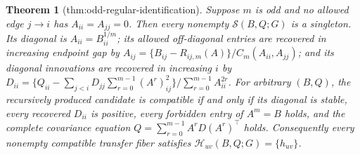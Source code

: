 \documentclass{article}
\newtheorem{theorem}{Theorem}
\begin{document}
\begin{theorem}[thm:odd-regular-identification]\label{thm:odd-regular-identification}
Suppose \(m\) is odd and no allowed edge \(j\to i\) has \(A_{ii}=A_{jj}=0\). Then every nonempty \(\mathcal S(B,Q;G)\) is a singleton. Its diagonal is \(A_{ii}=B_{ii}^{1/m}\); its allowed off-diagonal entries are recovered in increasing endpoint gap by \(A_{ij}=\{B_{ij}-R_{ij,m}(A)\}/C_m(A_{ii},A_{jj})\); and its diagonal innovations are recovered in increasing \(i\) by \(D_{ii}=\{Q_{ii}-\sum_{j<i}D_{jj}\sum_{r=0}^{m-1}(A^r)_{ij}^2\}/\sum_{r=0}^{m-1}A_{ii}^{2r}\). For arbitrary \((B,Q)\), the recursively produced candidate is compatible if and only if its diagonal is stable, every recovered \(D_{ii}\) is positive, every forbidden entry of \(A^m=B\) holds, and the complete covariance equation \(Q=\sum_{r=0}^{m-1}A^rD(A^r)^\top\) holds. Consequently every nonempty compatible transfer fiber satisfies \(\mathcal H_{uv}(B,Q;G)=\{h_{uv}\}\).
\end{theorem}
\end{document}
